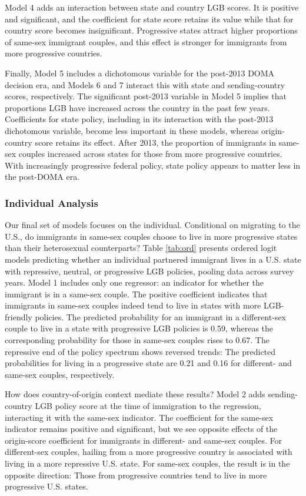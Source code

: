 \documentclass[
  11pt,
]{article}
\begin{document}
Model 4 adds an interaction between state and country LGB scores. It is positive and significant, and the coefficient for state score retains its value while that for country score becomes insignificant. Progressive states attract higher proportions of same-sex immigrant couples, and this effect is stronger for immigrants from more progressive countries.

Finally, Model 5 includes a dichotomous variable for the post-2013 DOMA decision era, and Models 6 and 7 interact this with state and sending-country scores, respectively. The significant post-2013 variable in Model 5 implies that proportions LGB have increased across the country in the past few years. Coefficients for state policy, including in its interaction with the post-2013 dichotomous variable, become less important in these models, whereas origin-country score retains its effect. After 2013, the proportion of immigrants in same-sex couples increased across states for those from more progressive countries. With increasingly progressive federal policy, state policy appears to matter less in the post-DOMA era.

\hypertarget{individual-analysis}{%
\subsubsection{Individual Analysis}\label{individual-analysis}}

Our final set of models focuses on the individual. Conditional on migrating to the U.S., do immigrants in same-sex couples choose to live in more progressive states than their heterosexual counterparts? Table \ref{tab:ord} presents ordered logit models predicting whether an individual partnered immigrant lives in a U.S. state with repressive, neutral, or progressive LGB policies, pooling data across survey years. Model 1 includes only one regressor: an indicator for whether the immigrant is in a same-sex couple. The positive coefficient indicates that immigrants in same-sex couples indeed tend to live in states with more LGB-friendly policies. The predicted probability for an immigrant in a different-sex couple to live in a state with progressive LGB policies is 0.59, whereas the corresponding probability for those in same-sex couples rises to 0.67. The repressive end of the policy spectrum shows reversed trends: The predicted probabilities for living in a progressive state are 0.21 and 0.16 for different- and same-sex couples, respectively.

How does country-of-origin context mediate these results? Model 2 adds sending-country LGB policy score at the time of immigration to the regression, interacting it with the same-sex indicator. The coefficient for the same-sex indicator remains positive and significant, but we see opposite effects of the origin-score coefficient for immigrants in different- and same-sex couples. For different-sex couples, hailing from a more progressive country is associated with living in a more repressive U.S. state. For same-sex couples, the result is in the opposite direction: Those from progressive countries tend to live in more progressive U.S. states.
\end{document}
